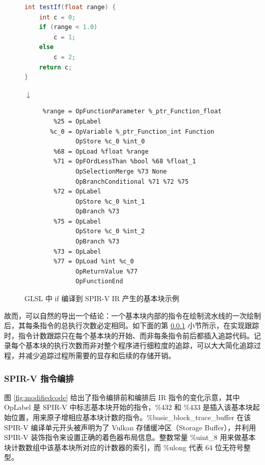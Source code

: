\begin{figure}
\centering
\begin{lstlisting}[language=GLSL]
int testIf(float range) {
    int c = 0;
    if (range < 1.0)
        c = 1;
    else
        c = 2;
    return c;
}
\end{lstlisting}
$ \downarrow $
\begin{lstlisting}[language=spirvir]
%testIf_f1_ = OpFunction %int None %22
     %range = OpFunctionParameter %_ptr_Function_float
        %25 = OpLabel
       %c_0 = OpVariable %_ptr_Function_int Function
              OpStore %c_0 %int_0
        %68 = OpLoad %float %range                       
        %71 = OpFOrdLessThan %bool %68 %float_1
              OpSelectionMerge %73 None                  
              OpBranchConditional %71 %72 %75
        %72 = OpLabel
              OpStore %c_0 %int_1
              OpBranch %73
        %75 = OpLabel
              OpStore %c_0 %int_2
              OpBranch %73
        %73 = OpLabel
        %77 = OpLoad %int %c_0
              OpReturnValue %77
              OpFunctionEnd
\end{lstlisting}
\caption{GLSL 中 if 编译到 SPIR-V IR 产生的基本块示例}
\label{fig:if_spv_ir}
\end{figure}

{\amend 故而，}可以自然的导出一个结论：一个基本块内部的指令在绘制流水线的一次绘制后，其每条指令的总执行次数必定相同。如{\amend 下面的}第 \ref{subsec:spv_instrumentation} 小节所示，在实现跟踪时，指令计数跟踪只在每个基本块的开始、而非每条指令前后都插入追踪代码。记录每个基本块的执行次数而非对整个程序进行细粒度的追踪，可以大大简化追踪过程，并减少追踪过程所需要的显存和后续的存储开销。

\subsubsection{SPIR-V 指令编排}
\label{subsec:spv_instrumentation}

图 \ref{fig:modifiedcode} 给出了指令编排前和编排后 IR 指令的变化{\amend 示意}，其中 OpLabel 是 SPIR-V 中标志基本块开始的指令，\%432 和 \%433 是插入该基本块起始位置，用来原子增相应基本块计数的指令。\%basic\_block\_trace\_buffer 在该 SPIR-V 编译单元开头被声明为了 Vulkan 存储缓冲区（Storage Buffer），并利用 SPIR-V 装饰指令来设置正确的着色器布局信息。整数常量 \%uint\_8 用来做基本块计数数组中该基本块所对应的计数器的索引，而 \%ulong 代表 64 位无符号整型。

